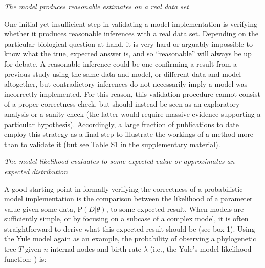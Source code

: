 \documentclass[oneside]{article}
\begin{document}


\vspace{.25cm}
\noindent \emph{The model produces reasonable estimates on a real
  data set}

One initial yet insufficient step in validating a model implementation
is verifying whether it produces reasonable inferences with a real
data set.
Depending on the particular biological question at hand, it is very
hard or arguably impossible to know what the true, expected answer is,
and so ``reasonable'' will always be up for debate.
A reasonable inference could be one confirming a result from a previous study
using the same data and model, or different data and model
altogether, but contradictory inferences do not necessarily imply a model
was incorrectly implemented.
For this reason, this validation procedure cannot consist of a proper
correctness check, but should instead be seen as an exploratory
analysis or a sanity check (the latter would require massive
evidence supporting a particular hypothesis).
Accordingly, a large fraction of publications to date employ this
strategy as a final step to illustrate the workings of a method more
than to validate it (but see Table S1 in the supplementary material).

\vspace{.5cm}
\noindent \emph{The model likelihood evaluates to some
  expected value or approximates an expected distribution}

A good starting point in formally verifying the correctness of a
probabilistic model implementation is the comparison between the
likelihood of a parameter value given some data, $\text{P}(D|\theta)$, to
some expected result.
When models are sufficiently simple, or by focusing
on a subcase of a complex model, it is often straightforward to derive
what this expected result should be (see box 1).
Using the Yule model again as an example, the probability of observing
a phylogenetic tree $T$ given $n$ internal nodes and birth-rate
$\lambda$ (i.e., the Yule's model likelihood function;
\citealp{nee01}) is:
\end{document}

